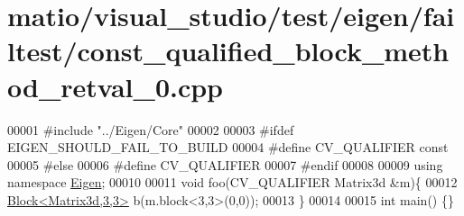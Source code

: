 \hypertarget{matio_2visual__studio_2test_2eigen_2failtest_2const__qualified__block__method__retval__0_8cpp_source}{}\section{matio/visual\+\_\+studio/test/eigen/failtest/const\+\_\+qualified\+\_\+block\+\_\+method\+\_\+retval\+\_\+0.cpp}
\label{matio_2visual__studio_2test_2eigen_2failtest_2const__qualified__block__method__retval__0_8cpp_source}

\begin{DoxyCode}
00001 \textcolor{preprocessor}{#include "../Eigen/Core"}
00002 
00003 \textcolor{preprocessor}{#ifdef EIGEN\_SHOULD\_FAIL\_TO\_BUILD}
00004 \textcolor{preprocessor}{#define CV\_QUALIFIER const}
00005 \textcolor{preprocessor}{#else}
00006 \textcolor{preprocessor}{#define CV\_QUALIFIER}
00007 \textcolor{preprocessor}{#endif}
00008 
00009 \textcolor{keyword}{using namespace }\hyperlink{namespace_eigen}{Eigen};
00010 
00011 \textcolor{keywordtype}{void} foo(CV\_QUALIFIER Matrix3d &m)\{
00012     \hyperlink{group___core___module_class_eigen_1_1_block}{Block<Matrix3d,3,3>} b(m.block<3,3>(0,0));
00013 \}
00014 
00015 \textcolor{keywordtype}{int} main() \{\}
\end{DoxyCode}

